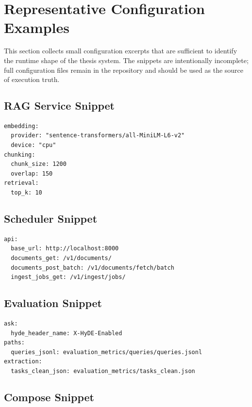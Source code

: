 \section{Representative Configuration Examples}

This section collects small configuration excerpts that are sufficient to identify the runtime shape of the thesis system. The snippets are intentionally incomplete; full configuration files remain in the repository and should be used as the source of execution truth.

\subsection{RAG Service Snippet}

\begin{lstlisting}[language={},caption={RAG service retrieval controls.}]
embedding:
  provider: "sentence-transformers/all-MiniLM-L6-v2"
  device: "cpu"
chunking:
  chunk_size: 1200
  overlap: 150
retrieval:
  top_k: 10
\end{lstlisting}

\subsection{Scheduler Snippet}

\begin{lstlisting}[language={},caption={Scheduler to RAG API integration.}]
api:
  base_url: http://localhost:8000
  documents_get: /v1/documents/
  documents_post_batch: /v1/documents/fetch/batch
  ingest_jobs_get: /v1/ingest/jobs/
\end{lstlisting}

\subsection{Evaluation Snippet}

\begin{lstlisting}[language={},caption={Evaluation modes and extraction reference.}]
ask:
  hyde_header_name: X-HyDE-Enabled
paths:
  queries_jsonl: evaluation_metrics/queries/queries.jsonl
extraction:
  tasks_clean_json: evaluation_metrics/tasks_clean.json
\end{lstlisting}

\subsection{Compose Snippet}

